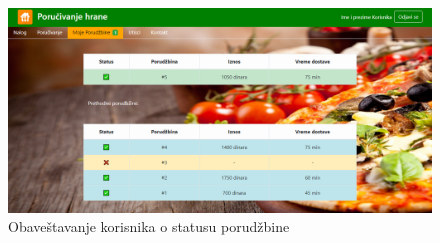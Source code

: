 \begin{figure}[!h]
    \includegraphics[width=1\textwidth]{slike/porudzbina.png}
    \caption{Obaveštavanje korisnika o statusu porudžbine} %
    \label{fig:slika_obrada_porudzbina}
\end{figure}
